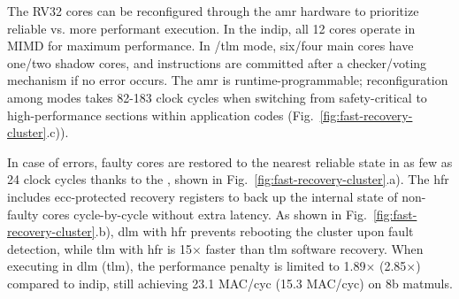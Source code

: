 %
The RV32 cores can be reconfigured through the \gls{amr} hardware to prioritize reliable vs. more performant execution. In the \gls{indip}, all 12 cores operate in MIMD for maximum performance. In  /\gls{tlm} mode, six/four main cores have one/two shadow cores, and instructions are committed after a checker/voting mechanism if no error occurs. The \gls{amr} is runtime-programmable; reconfiguration among modes takes 82-183 clock cycles when switching from safety-critical to high-performance sections within application codes (Fig.~\ref{fig:fast-recovery-cluster}.c)). 

%
In case of errors, faulty cores are restored to the nearest reliable state in as few as 24 clock cycles thanks to the , shown in Fig.~\ref{fig:fast-recovery-cluster}.a). 
The \gls{hfr} includes \gls{ecc}-protected recovery registers to back up the internal state of non-faulty cores cycle-by-cycle without extra latency. 
As shown in Fig.~\ref{fig:fast-recovery-cluster}.b), \gls{dlm} with \gls{hfr} prevents rebooting the cluster upon fault detection, while \gls{tlm} with \gls{hfr} is 15$\times$ faster than \gls{tlm} software recovery. 
%
When executing in \gls{dlm} (\gls{tlm}), the performance penalty is limited to 1.89$\times$ (2.85$\times$) compared to \gls{indip}, still achieving 23.1 MAC/cyc (15.3 MAC/cyc)  on 8b \glspl{matmul}.

